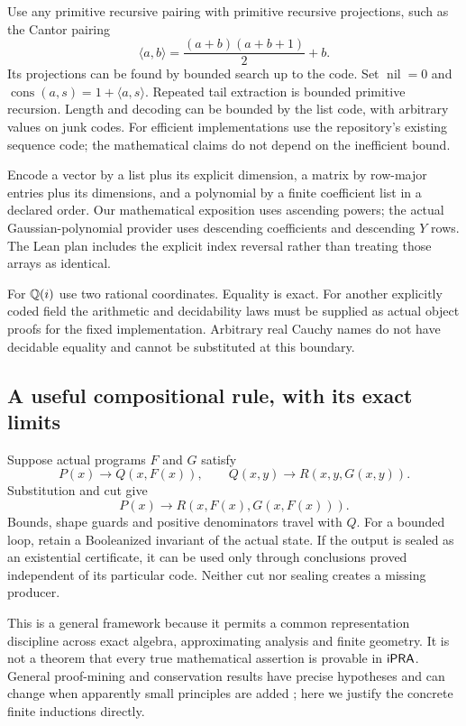 Use any primitive recursive pairing with primitive recursive projections, such as the Cantor pairing
\[
 \langle a,b\rangle=\frac{(a+b)(a+b+1)}2+b.
\]
Its projections can be found by bounded search up to the code. Set $\operatorname{nil}=0$ and $\operatorname{cons}(a,s)=1+\langle a,s\rangle$. Repeated tail extraction is bounded primitive recursion. Length and decoding can be bounded by the list code, with arbitrary values on junk codes. For efficient implementations use the repository's existing sequence code; the mathematical claims do not depend on the inefficient bound.

Encode a vector by a list plus its explicit dimension, a matrix by row-major entries plus its dimensions, and a polynomial by a finite coefficient list in a declared order. Our mathematical exposition uses ascending powers; the actual Gaussian-polynomial provider uses descending coefficients and descending $Y$ rows. The Lean plan includes the explicit index reversal rather than treating those arrays as identical.

For $\mathbb Q(i)$ use two rational coordinates. Equality is exact. For another explicitly coded field the arithmetic and decidability laws must be supplied as actual object proofs for the fixed implementation. Arbitrary real Cauchy names do not have decidable equality and cannot be substituted at this boundary.

\subsection{A useful compositional rule, with its exact limits}

Suppose actual programs $F$ and $G$ satisfy
\[
 P(x)\to Q(x,F(x)),\qquad
 Q(x,y)\to R(x,y,G(x,y)).
\]
Substitution and cut give
\[
 P(x)\to R(x,F(x),G(x,F(x))).
\]
Bounds, shape guards and positive denominators travel with $Q$. For a bounded loop, retain a Booleanized invariant of the actual state. If the output is sealed as an existential certificate, it can be used only through conclusions proved independent of its particular code. Neither cut nor sealing creates a missing producer.

This is a general framework because it permits a common representation discipline across exact algebra, approximating analysis and finite geometry. It is not a theorem that every true mathematical assertion is provable in $\mathsf{iPRA}$. General proof-mining and conservation results have precise hypotheses and can change when apparently small principles are added \cite{kohlenbach-pra}; here we justify the concrete finite inductions directly.

